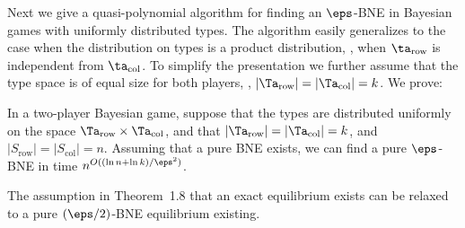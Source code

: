 Next we give a quasi-polynomial algorithm for finding an $\eps$-BNE in
Bayesian games with uniformly distributed types.  The algorithm easily
generalizes to the case when the distribution on types is a product
distribution, \ie, when $\ta_{\mathrm{row}}$ is independent from
$\ta_\mathrm{col}$.  To simplify the presentation we further assume
that the type space is of equal size for both players,
\ie, $|\Ta_{\mathrm{row}}|=|\Ta_\mathrm{col}|=k$.  We prove:

\begin{theorem}
\label{thm:BNEeasy-formal} In a two-player Bayesian game,
suppose that the types are distributed uniformly on the space $\Ta_{\mathrm{row}}\times\Ta_\mathrm{col}$, and that $|\Ta_{\mathrm{row}}|=|\Ta_\mathrm{col}|=k$, and $|S_{\mathrm{row}}|=|S_\mathrm{col}|=n$. 
Assuming that a pure BNE exists, we can find a pure $\eps$-BNE in time $n^{O((\ln n+\ln k)/\eps^2)}$. 
\end{theorem}

\begin{remark}
  The assumption in Theorem~1.8 that an exact equilibrium exists can be relaxed to a pure $(\eps/2)$-BNE equilibrium existing.
\end{remark}


